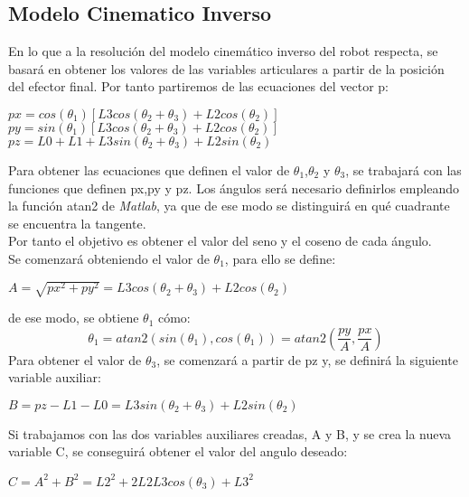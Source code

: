 	\subsection{Modelo Cinematico Inverso}
	
	En lo que a la resolución del modelo cinemático inverso del robot respecta, se basará en obtener los valores de las variables articulares a partir de la posición del efector final. Por tanto partiremos de las ecuaciones del vector p:
	
	\begin{center}
		$px=cos(\theta_{1})[L3cos(\theta_{2}+\theta_{3}) + L2cos(\theta_{2})]$ \\ 
		$py=sin(\theta_{1})[L3cos(\theta_{2}+\theta_{3}) + L2cos(\theta_{2})]$ \\ 
		$pz=L0 + L1 + L3sin(\theta_{2}+\theta_{3}) + L2sin(\theta_{2})$			
	\end{center}
	
	Para obtener las ecuaciones que definen el valor de $\theta_{1}$,$\theta_{2}$ y $\theta_{3}$, se trabajará con las funciones que definen px,py y pz. Los ángulos será necesario definirlos empleando la función atan2 de \textit{Matlab}, ya que de ese modo se distinguirá en qué cuadrante se encuentra la tangente.\\
	Por tanto el objetivo es obtener el valor del seno y el coseno de cada ángulo.\\
	
	Se comenzará obteniendo el valor de $\theta_{1}$, para ello se define:\\
	\begin{center}
		$ A = \sqrt{px^{2}+py^{2}} = L3cos(\theta_{2}+\theta_{3}) + L2cos(\theta_{2})$
	\end{center}
	de ese modo, se obtiene $\theta_{1}$ cómo:\\
	\begin{equation}
	\theta_{1}=atan2(sin(\theta_{1}),cos(\theta_{1}))=atan2(\frac{py}{A},\frac{px}{A})
	\end{equation}
	Para obtener el valor de $\theta_{3}$, se comenzará a partir de pz y, se definirá la siguiente variable auxiliar:\\
	\begin{center}
		$ B=pz-L1-L0=L3sin(\theta_{2}+\theta_{3}) + L2sin(\theta_{2})$
	\end{center}
	Si trabajamos con las dos variables auxiliares creadas, A y B, y se crea la nueva variable C, se conseguirá obtener el valor del angulo deseado:\\
	\begin{center}
		$C= A^{2} + B^{2} = L2^{2}+ 2L2L3cos(\theta_{3}) + L3^{2} $
	\end{center}
	
